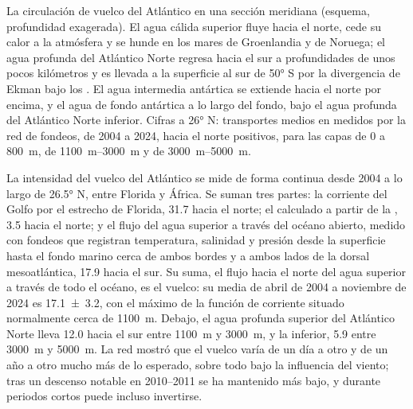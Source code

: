 \begin{omfigure}
{\small La circulación de vuelco del Atlántico en una sección meridiana (esquema, profundidad exagerada). El agua cálida superior fluye hacia el norte, cede su calor a la atmósfera y se hunde en los mares de Groenlandia y de Noruega; el agua profunda del Atlántico Norte regresa hacia el sur a profundidades de unos pocos kilómetros y es llevada a la superficie al sur de \ang{50} S por la divergencia de Ekman bajo los . El agua intermedia antártica se extiende hacia el norte por encima, y el agua de fondo antártica a lo largo del fondo, bajo el agua profunda del Atlántico Norte inferior. Cifras a \ang{26} N: transportes medios en  medidos por la red de fondeos, de 2004 a 2024, hacia el norte positivos, para las capas de 0 a \qty{800}{m}, de \qtyrange{1100}{3000}{m} y de \qtyrange{3000}{5000}{m}.}
\label{fig:b1:ocean-circulation:moc}
\end{omfigure}

La intensidad del vuelco del Atlántico se mide de forma continua desde 2004 a lo largo de \ang{26.5} N, entre Florida y África. Se suman tres partes: la corriente del Golfo por el estrecho de Florida, \qty{31.7}{\sverdrup} hacia el norte; el  calculado a partir de la , \qty{3.5}{\sverdrup} hacia el norte; y el flujo del agua superior a través del océano abierto, medido con fondeos que registran temperatura, salinidad y presión desde la superficie hasta el fondo marino cerca de ambos bordes y a ambos lados de la dorsal mesoatlántica, \qty{17.9}{\sverdrup} hacia el sur. Su suma, el flujo hacia el norte del agua superior a través de todo el océano, es el vuelco: su media de abril de 2004 a noviembre de 2024 es \qty[uncertainty-mode=separate]{17.1 \pm 3.2}{\sverdrup}, con el máximo de la función de corriente situado normalmente cerca de \qty{1100}{m}. Debajo, el agua profunda superior del Atlántico Norte lleva \qty{12.0}{\sverdrup} hacia el sur entre \qty{1100}{m} y \qty{3000}{m}, y la inferior, \qty{5.9}{\sverdrup} entre \qty{3000}{m} y \qty{5000}{m}. La red mostró que el vuelco varía de un día a otro y de un año a otro mucho más de lo esperado, sobre todo bajo la influencia del viento; tras un descenso notable en 2010--2011 se ha mantenido más bajo, y durante periodos cortos puede incluso invertirse.

